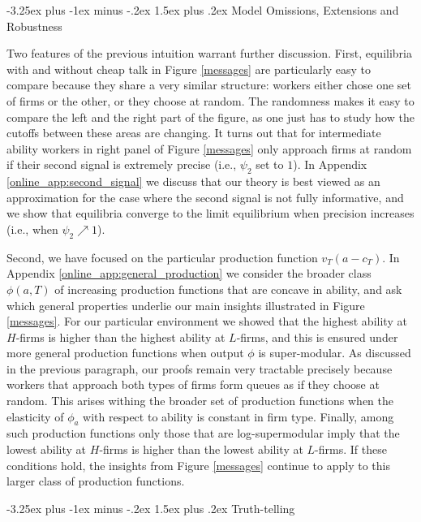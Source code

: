 \documentclass[12pt]{article}
\makeatletter
\renewcommand{\subsection}{%
  \@startsection{subsection}{2}{\z@}%
  {-3.25ex plus -1ex minus -.2ex}%
  {1.5ex plus .2ex}%
  {\normalfont\large\bfseries}%
}
\makeatother
\begin{document}
\subsection{Model Omissions, Extensions and Robustness}
\label{sec:robustness}

Two features of the previous intuition warrant further discussion. First, equilibria with and without cheap talk in Figure \ref{messages} are particularly easy to compare because they share a very similar structure: workers either chose one set of firms or the other, or they choose at random. The randomness makes it easy to compare the left and the right part of the figure, as one just has to study how the cutoffs between these areas are changing. It turns out that for intermediate ability workers in right panel of Figure \ref{messages} only approach firms at random if their second signal is extremely precise (i.e., $\psi_2$ set to $1$). In Appendix \ref{online_app:second_signal} we discuss that our theory is best viewed as an approximation for the case where the second signal is not fully informative, and we show that equilibria converge to the limit equilibrium when precision increases (i.e., when $\psi_2 \nearrow 1$). 

Second, we have focused on the particular production function $v_T(a-c_T)$. In Appendix \ref{online_app:general_production} we consider the broader class $\phi(a,T)$ of increasing production functions that are concave in ability, and ask which general properties underlie our main insights illustrated in Figure \ref{messages}. For our particular environment we showed that the highest ability at $H$-firms is higher than the highest ability at $L$-firms, and this is ensured under more general production functions when output $\phi$ is super-modular. As discussed in the previous paragraph, our proofs remain very tractable precisely because workers that approach both types of firms form queues as if they choose at random. This arises withing the broader set of production functions when the elasticity of $\phi_a$ with respect to ability is constant in firm type. Finally, among such production functions only those that are log-supermodular imply that the lowest ability at $H$-firms is higher than the lowest ability at $L$-firms. If these conditions hold, the insights from Figure \ref{messages} continue to apply to this larger class of production functions. 



\subsection{Truth-telling} \label{sec:truth-telling}
\end{document}
